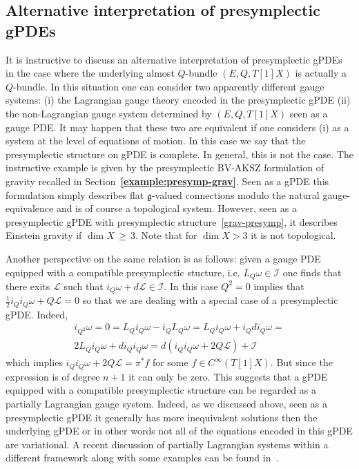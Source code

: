 \documentclass[a4paper,12pt]{article}
\numberwithin{equation}{section} %
\newcommand{\bref}[1]{\textbf{\ref{#1}}}
\renewcommand{\geq}{\,{\geqslant}\,}
\newcommand{\Liealg}{\mathfrak}
\newcommand{\algg}{\Liealg{g}}
\def\cI{\mathcal{I}}
\def\cL{\mathcal{L}}
\begin{document}
\subsection{Alternative interpretation of presymplectic gPDEs} \label{sec:altern_interpr}

It is instructive to discuss an alternative interpretation of presymplectic gPDEs in the case where the underlying almost $Q$-bundle $(E,Q,T[1]X)$ is actually a $Q$-bundle. In this situation one can consider two apparently different gauge systems: (i) the Lagrangian gauge theory encoded in the presymplectic gPDE (ii) the non-Lagrangian gauge system determined by $(E,Q,T[1]X)$
seen as a gauge PDE. It may happen that these two are equivalent if one considers (i) as a system at the level of equations of motion. In this case we say that the presymplectic structure on gPDE is complete. In general, this is not the case. The instructive example is given by the presymplectic BV-AKSZ formulation of gravity recalled in Section~\bref{example:presymp-grav}. Seen as a gPDE this formulation simply describes flat $\algg$-valued connections modulo the natural gauge-equivalence and is of course a topological system. However, seen as a presymplectic gPDE with presymplectic structure~\eqref{grav-presymp}, it describes Einstein gravity if $\dim{X}\geq 3$. Note that for $\dim{X}>3$ it is not topological. 

Another perspective on the same relation is as follows: given a gauge PDE equipped with a compatible presymplectic stucture, i.e. $L_Q\omega\in \cI$ one finds that there exits $\cL$ such that $i_Q\omega+d\cL\in\cI$. In this case $Q^2=0$ implies that $\frac{1}{2} i_Q i_Q\omega + Q\mathcal{L} = 0$ so that we are dealing with a special case of a presymplectic gPDE. Indeed, 
\begin{multline}
    i_{Q^2}\omega = 0 = L_Q i_Q\omega - i_Q L_Q \omega = L_Q i_Q\omega + i_Q d i_Q \omega  =\\ 2L_Qi_Q \omega + di_Qi_Q\omega  = d(i_Qi_Q\omega + 2Q\cL) + \cI 
    \end{multline}
which implies $i_Qi_Q\omega + 2Q\cL = \pi^*f$ for some $f\in C^\infty(T[1]X)$. But since the expression is of degree $n+1$ it can only be zero. This suggests that a gPDE equipped with a compatible presymplectic structure can be regarded as a partially Lagrangian gauge system. Indeed, as we discussed above, seen as a presymplectic gPDE it generally has more inequivalent solutions then the underlying gPDE or in other words not all of the equations encoded in this gPDE are variational. A recent discussion of partially Lagrangian systems within a different framework along with some examples can be found in~\cite{Lyakhovich:2024yai}.   
\end{document}
